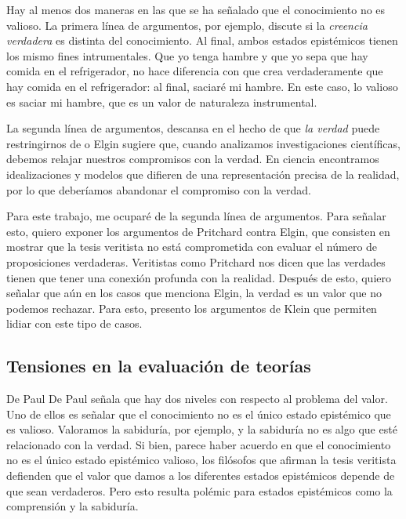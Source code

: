 Hay al menos dos maneras en las que se ha señalado que el conocimiento no es valioso.
La primera línea de argumentos, por ejemplo, discute si la \textit{creencia verdadera} es distinta del conocimiento.
Al final, ambos estados epistémicos tienen los mismo fines intrumentales.
Que yo tenga hambre y que yo sepa que hay comida en el refrigerador, no hace diferencia con que crea verdaderamente que hay comida en el refrigerador: al final, saciaré mi hambre.
En este caso, lo valioso es saciar mi hambre, que es un valor de naturaleza instrumental.

La segunda línea de argumentos, descansa en el hecho de que \textit{la verdad} puede restringirnos de o%
Elgin sugiere que, cuando analizamos investigaciones científicas, debemos relajar nuestros compromisos con la verdad.
En ciencia encontramos idealizaciones y modelos que difieren de una representación precisa de la realidad, por lo que deberíamos abandonar el compromiso con la verdad.

Para este trabajo, me ocuparé de la segunda línea de argumentos.
Para señalar esto, quiero exponer los argumentos de Pritchard contra Elgin, que consisten en mostrar que la tesis veritista no está comprometida con evaluar el número de proposiciones verdaderas.
Veritistas como Pritchard nos dicen que las verdades tienen que tener una conexión profunda con la realidad.
Después de esto, quiero señalar que aún en los casos que menciona Elgin, la verdad es un valor que no podemos rechazar.
Para esto, presento los argumentos de Klein que permiten lidiar con este tipo de casos.

\subsection{Tensiones en la evaluación de teorías}

De Paul %
De Paul señala que hay dos niveles con respecto al problema del valor.
Uno de ellos es señalar que el conocimiento no es el único estado epistémico que es valioso.
Valoramos la sabiduría, por ejemplo, y la sabiduría no es algo que esté relacionado con la verdad.
Si bien, parece haber acuerdo en que el conocimiento no es el único estado epistémico valioso, los filósofos que afirman la tesis veritista defienden que el valor que damos a los diferentes estados epistémicos depende de que sean verdaderos.
Pero esto resulta polémic para estados epistémicos como la comprensión y la sabiduría.


